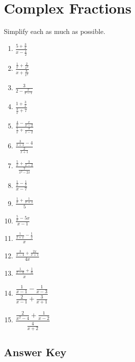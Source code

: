 \chapter{Complex Fractions}

Simplify each as much as possible.

\begin{multicols}{3}
\begin{enumerate}
\setlength\itemsep{10pt}
\item $\frac{5+\frac{3}{x}}{x-\frac{1}{2}}$
\item $\frac{\frac{1}{x}+\frac{2}{x^2}}{x+\frac{8}{x^2}}$
\item $\frac{3}{2-\frac{x}{x-1}}$
\item $\frac{1+\frac{3}{x}}{\frac{2}{x}+7}$
\item $\frac{\frac{4}{x}-\frac{x}{x-2}}{\frac{1}{x}+{\frac{3}{x-2}}}$
\item $\frac{\frac{3}{x+1}-4}{\frac{2}{x+1}}$
\item $\frac{\frac{5}{x}+\frac{3}{x-2}}{\frac{7}{x^2-2x}}$
\item $\frac{\frac{1}{x}-\frac{1}{7}}{x-7}$
\item $\frac{\frac{1}{x}+\frac{1}{x+1}}{5}$
\item $\frac{\frac{5}{x}-5x}{x-1}$
\item $\frac{\frac{1}{2+x}-\frac{1}{2}}{x}$
\item $\frac{\frac{3}{x-4}+\frac{2x}{x+1}}{4x}$
\item $\frac{\frac{1}{x-a}+\frac{1}{a}}{x}$
\item $\dfrac{\frac{1}{x-1}-\frac{1}{x-3}}{\frac{2}{x-1}+\frac{3}{x+1}}$
\item $\dfrac{\frac{2}{x^2-4}+\frac{1}{x-2}}{\frac{4}{x+2}}$
\end{enumerate}
\end{multicols}

\newpage

\section{Answer Key}

